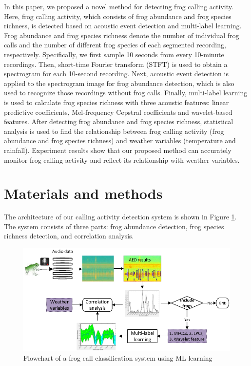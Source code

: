 In this paper, we proposed a novel method for detecting frog calling activity. Here, frog calling activity, which consists of frog abundance and frog species richness, is detected based on acoustic event detection and multi-label learning. Frog abundance and frog species richness denote the number of individual frog calls and the number of different frog species of each segmented recording, respectively. Specifically, we first sample 10 seconds from every 10-minute recordings. Then, short-time Fourier transform (STFT) is used to obtain a spectrogram for each 10-second recording. Next, acoustic event detection is applied to the spectrogram image for frog abundance detection, which is also used to recognize those recordings without frog calls. Finally, multi-label learning is used to calculate frog species richness with three acoustic features: linear predictive coefficients, Mel-frequency Cepstral coefficients and wavelet-based features. After detecting frog abundance and  frog species richness, statistical analysis is used to find the relationship between frog calling activity (frog abundance and frog species richness) and weather variables (temperature and rainfall). Experiment results show that our proposed method can accurately monitor frog calling activity and reflect its relationship with weather variables.


\section{Materials and methods}
The architecture of our calling activity detection system is shown in Figure \ref{fig:Ch7_flowchart}. The system consists of three parts: frog abundance detection, frog species richness detection, and correlation analysis.

\begin{figure}[htb!]
\centering
\includegraphics[width=\textwidth]{image/Ch7/flowchart.pdf}
\caption{Flowchart of a frog call classification system using ML learning}
\label{fig:Ch7_flowchart}
\end{figure}


